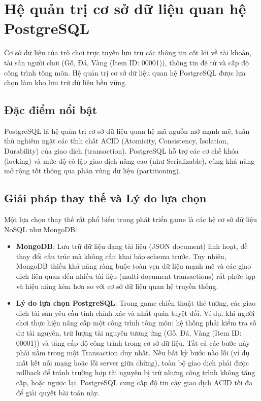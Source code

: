 \documentclass[../Project.tex]{subfiles}
\begin{document}
\section{Hệ quản trị cơ sở dữ liệu quan hệ PostgreSQL}
\label{sec:tech_postgres}
Cơ sở dữ liệu của trò chơi trực tuyến lưu trữ các thông tin cốt lõi về tài khoản, tài sản người chơi (Gỗ, Đá, Vàng (Item ID: 00001)), thông tin đệ tử và cấp độ công trình tông môn. Hệ quản trị cơ sở dữ liệu quan hệ PostgreSQL \cite{postgresql2026} được lựa chọn làm kho lưu trữ dữ liệu bền vững.

\subsection{Đặc điểm nổi bật}
PostgreSQL là hệ quản trị cơ sở dữ liệu quan hệ mã nguồn mở mạnh mẽ, tuân thủ nghiêm ngặt các tính chất ACID (Atomicity, Consistency, Isolation, Durability) của giao dịch (transaction). PostgreSQL hỗ trợ các cơ chế khóa (locking) và mức độ cô lập giao dịch nâng cao (như Serializable), cùng khả năng mở rộng tốt thông qua phân vùng dữ liệu (partitioning).

\subsection{Giải pháp thay thế và Lý do lựa chọn}
Một lựa chọn thay thế rất phổ biến trong phát triển game là các hệ cơ sở dữ liệu NoSQL như MongoDB:
\begin{itemize}
    \item \textbf{MongoDB}: Lưu trữ dữ liệu dạng tài liệu (JSON document) linh hoạt, dễ thay đổi cấu trúc mà không cần khai báo schema trước. Tuy nhiên, MongoDB thiếu khả năng ràng buộc toàn vẹn dữ liệu mạnh mẽ và các giao dịch liên quan đến nhiều tài liệu (multi-document transactions) rất phức tạp và hiệu năng kém hơn so với cơ sở dữ liệu quan hệ truyền thống.
    \item \textbf{Lý do lựa chọn PostgreSQL}: Trong game chiến thuật thẻ tướng, các giao dịch tài sản yêu cầu tính chính xác và nhất quán tuyệt đối. Ví dụ, khi người chơi thực hiện nâng cấp một công trình tông môn: hệ thống phải kiểm tra số dư tài nguyên, trừ lượng tài nguyên tương ứng (Gỗ, Đá, Vàng (Item ID: 00001)) và tăng cấp độ công trình trong cơ sở dữ liệu. Tất cả các bước này phải nằm trong một Transaction duy nhất. Nếu bất kỳ bước nào lỗi (ví dụ mất kết nối mạng hoặc lỗi server giữa chừng), toàn bộ giao dịch phải được rollback để tránh trường hợp tài nguyên bị trừ nhưng công trình không tăng cấp, hoặc ngược lại. PostgreSQL cung cấp độ tin cậy giao dịch ACID tối đa để giải quyết bài toán này.
\end{itemize}
\end{document}
